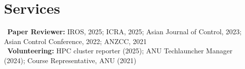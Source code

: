 \section*{Services}
\textbullet~\textbf{Paper Reviewer:} IROS, 2025; ICRA, 2025; Asian Journal of Control, 2023; Asian Control Conference, 2022; ANZCC, 2021\\[0.5em]
\textbullet~\textbf{Volunteering:} HPC cluster reporter (2025); ANU Techlauncher Manager (2024); Course Representative, ANU (2021)